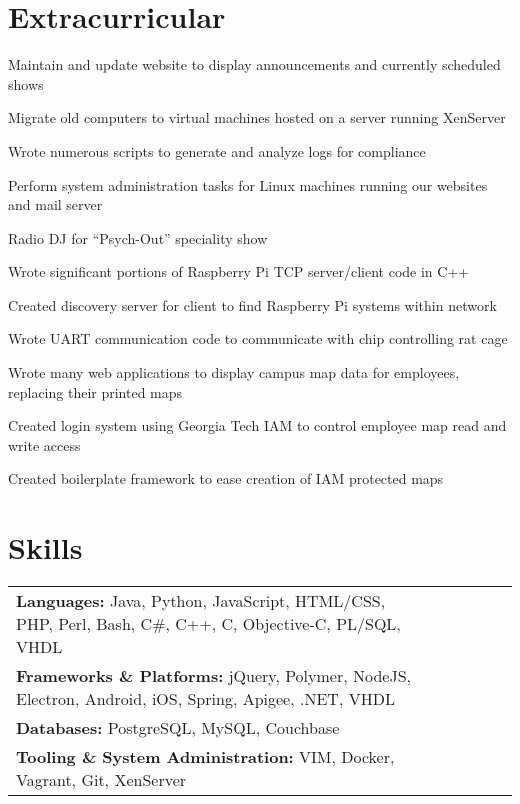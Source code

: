 \documentclass[line]{resume}
\begin{document}
\section{Extracurricular}
\begin{myitemize}
	\item Maintain and update website to display announcements and currently scheduled shows 
	\item Migrate old computers to virtual machines hosted on a server running XenServer 
	\item Wrote numerous scripts to generate and analyze logs for compliance
	\item Perform system administration tasks for Linux machines running our websites and mail server 
	\item Radio DJ for ``Psych-Out'' speciality show
\end{myitemize}

\begin{myitemize}
	\item Wrote significant portions of Raspberry Pi TCP server/client code in C++ 
	\item Created discovery server for client to find Raspberry Pi systems within network 
	\item Wrote UART communication code to communicate with chip controlling rat cage 
\end{myitemize}

\begin{myitemize}
	\item Wrote many web applications to display campus map data for employees, replacing their printed maps
	\item Created login system using Georgia Tech IAM to control employee map read and write access 
	\item Created boilerplate framework to ease creation of IAM protected maps 
\end{myitemize}
\section{Skills}
\begin{tabular}{l l l l l l}
	\textbf{Languages:} Java, Python, JavaScript, HTML/CSS, PHP, Perl, Bash, C\#, C++, C, Objective-C, PL/SQL, VHDL \\
	\textbf{Frameworks \& Platforms:} jQuery, Polymer, NodeJS, Electron, Android, iOS, Spring, Apigee, .NET, VHDL \\
	\textbf{Databases:} PostgreSQL, MySQL, Couchbase \\
	\textbf{Tooling \& System Administration:}  VIM, Docker, Vagrant, Git, XenServer \\
\end{tabular}
\end{document}
